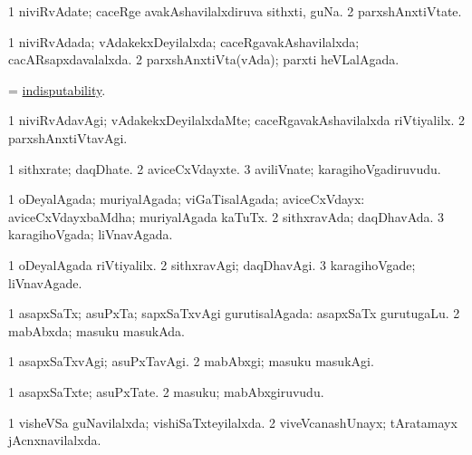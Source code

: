 \bentry
{}
\gl{\nA}
\bmng
\bnum
\num{1} niviRvAdate; caceRge avakAshavilalxdiruva sithxti, guNa. 
\num{2} parxshAnxtiVtate. 
\enum
\emng
\eentry

\bentry
{}
\gl{\gu}
\bmng
\bnum
\num{1} niviRvAdada; vAdakekxDeyilalxda; caceRgavakAshavilalxda; cacARsapxdavalalxda. 
\num{2} parxshAnxtiVta(vAda); parxti heVLalAgada. 
\enum
\emng
\eentry

\bentry
{}
\gl{\nA}
\bmng
 = \hyperlink{indisputability}{indisputability}. 
\emng
\eentry

\bentry
{}
\gl{\kirxvi}
\bmng
\bnum
\num{1} niviRvAdavAgi; vAdakekxDeyilalxdaMte; caceRgavakAshavilalxda riVtiyalilx. 
\num{2} parxshAnxtiVtavAgi. 
\enum
\emng
\eentry

\bentry
{}
\gl{\nA}
\bmng
\bnum
\num{1} sithxrate; daqDhate. 
\num{2} aviceCxVdayxte. 
\num{3} aviliVnate; karagihoVgadiruvudu. 
\enum
\emng
\eentry

\bentry
{}
\gl{\gu}
\bmng
\bnum
\num{1} oDeyalAgada; muriyalAgada; viGaTisalAgada; aviceCxVdayx:  aviceCxVdayxbaMdha; muriyalAgada kaTuTx. 
\num{2} sithxravAda; daqDhavAda. 
\num{3} karagihoVgada; liVnavAgada. 
\enum
\emng
\eentry

\bentry
{}
\gl{\kirxvi}
\bmng
\bnum
\num{1} oDeyalAgada riVtiyalilx. 
\num{2} sithxravAgi; daqDhavAgi. 
\num{3} karagihoVgade; liVnavAgade. 
\enum
\emng
\eentry

\bentry
{}
\gl{\gu}
\bmng
\bnum
\num{1} asapxSaTx; asuPxTa; sapxSaTxvAgi gurutisalAgada:  asapxSaTx gurutugaLu. 
\num{2} mabAbxda; masuku masukAda. 
\enum
\emng
\eentry

\bentry
{}
\gl{\kirxvi}
\bmng
\bnum
\num{1} asapxSaTxvAgi; asuPxTavAgi. 
\num{2} mabAbxgi; masuku masukAgi. 
\enum
\emng
\eentry

\bentry
{}
\gl{\nA}
\bmng
\bnum
\num{1} asapxSaTxte; asuPxTate. 
\num{2} masuku; mabAbxgiruvudu. 
\enum
\emng
\eentry

\bentry
{}
\gl{\kirxvi}
\bmng
\bnum
\num{1} visheVSa guNavilalxda; vishiSaTxteyilalxda. 
\num{2} viveVcanashUnayx; tAratamayx jAcnxnavilalxda. 
\enum
\emng
\eentry

